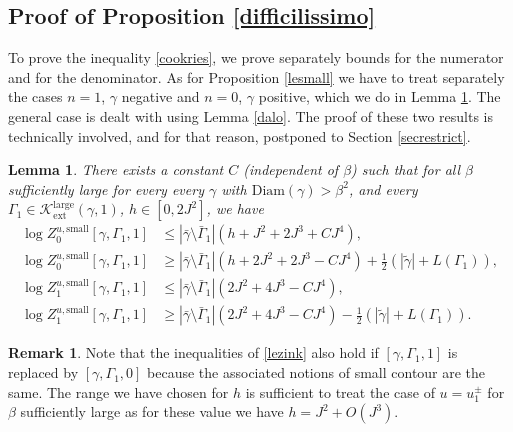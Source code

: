 \documentclass[JEP,XML,SOM,Unicode, NoFloatCountersInSection]{cedram}
\let\mathcal\mathscr
\numberwithin{equation}{section}
\theoremstyle{plain}
\newtheorem{lemma}[theorem]{Lemma}
\theoremstyle{definition}
\newtheorem{rem}[theorem]{Remark}
\newcommand{\ext}{\mathrm{ext}}
\newcommand{\sm}{\mathrm{small}}
\newcommand{\Diam}{\mathrm{Diam}}
\newcommand{\larg}{\mathrm{large}}
\newcommand{\cK}{{\ensuremath{\mathcal K}} }
\newcommand{\gb}{\beta}
\newcommand{\gG}{\Gamma}
\begin{document}
\subsection{Proof of Proposition \ref{difficilissimo}}\label{dcimo}

To prove the inequality \eqref{cookries}, we prove separately bounds for the numerator and for the denominator.
As for Proposition \ref{lesmall}
we have to treat separately the cases $n=1$, $\gamma$ negative and $n=0$, $\gamma$ positive, which we do in Lemma \ref{dzip}. The general case is dealt with using Lemma
\ref{dalo}.
The proof of these two results is technically involved, and for that reason, postponed to Section \ref{secrestrict}.

\begin{lemma}\label{dzip}
There exists a constant $C$ (independent of $\gb$) such that for all $\gb$ sufficiently large for every every $\gamma$ with $\Diam(\gamma)> \gb^2$, and every
$\gG_1\in \cK^{\larg}_{\ext}(\gamma,1)$,
$h\in \left[0,2J^2\right]$, we have
\begin{equation}\label{lezink}
\begin{split}
\log Z^{u,\sm}_{0}[\gamma,\Gamma_1,1]&\le|\bar \gamma \setminus \bar \Gamma_1|\left(h+J^2+2J^3+C J^4\right),\\
\log Z^{u,\sm}_{0}[\gamma,\Gamma_1,1]&\ge |\bar \gamma \setminus \bar \Gamma_1|\left(h+2J^2+2J^3-CJ^4\right)+\frac{1}{2}(|\tilde \gamma|+L(\gG_1)),\\
\log Z^{u,\sm}_{1}[\gamma,\Gamma_1,1]&\le|\bar \gamma \setminus \bar \Gamma_1|\left(2J^2+4J^3-C J^4\right),\\
\log Z^{u,\sm}_{1} [\gamma,\Gamma_1,1]&\ge |\bar \gamma \setminus \bar \Gamma_1| \left(2J^2+4J^3-CJ^4\right) -\frac{1}{2}(|\tilde \gamma|+L(\gG_1)).
\end{split}
\end{equation}
\end{lemma}

\begin{rem}
Note that the inequalities of \eqref{lezink} also hold if $[\gamma,\Gamma_1,1]$ is replaced by $[\gamma,\Gamma_1,0]$ because the associated notions of small contour are the same.
The range we have chosen for $h$ is sufficient to treat the case of $u=u^{\pm}_1$ for $\gb$ sufficiently large as for these value we have $h=J^2+O(J^3)$.
\end{rem}
\end{document}
